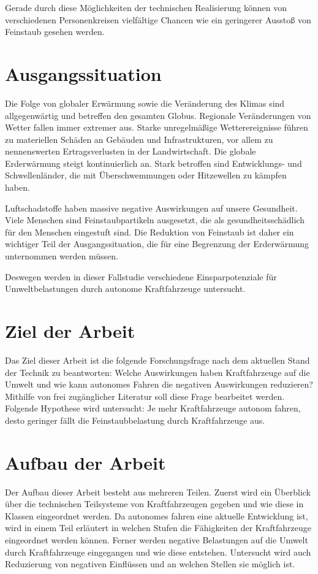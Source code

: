 Gerade durch diese Möglichkeiten der technischen Realisierung können von verschiedenen Personenkreisen
vielfältige Chancen wie ein geringerer Ausstoß von Feinstaub gesehen werden.

\section{Ausgangssituation}
Die Folge von globaler Erwärmung sowie die Veränderung des Klimas sind allgegenwärtig und betreffen den gesamten Globus.
Regionale Veränderungen von Wetter fallen immer extremer aus.
Starke unregelmäßige Wetterereignisse führen zu materiellen Schäden an Gebäuden und Infrastrukturen, vor allem zu nennenswerten Ertragsverlusten in der Landwirtschaft.
Die globale Erderwärmung steigt kontinuierlich an.
Stark betroffen sind Entwicklungs- und Schwellenländer, die mit Überschwemmungen oder Hitzewellen zu kämpfen haben.


Luftschadstoffe haben massive negative Auswirkungen auf unsere Gesundheit.
Viele Menschen sind Feinstaubpartikeln ausgesetzt, die als gesundheitsschädlich für den Menschen eingestuft sind.
Die Reduktion von Feinstaub ist daher ein wichtiger Teil der Ausgangssituation, die für eine Begrenzung der Erderwärmung unternommen werden müssen.

Deswegen werden in dieser Fallstudie verschiedene Einsparpotenziale für Umweltbelastungen durch autonome Kraftfahrzeuge untersucht.


\section{Ziel der Arbeit}
Das Ziel dieser Arbeit ist die folgende Forschungsfrage nach dem aktuellen Stand der Technik zu beantworten:
Welche Auswirkungen haben Kraftfahrzeuge auf die Umwelt und wie kann autonomes Fahren die negativen Auswirkungen reduzieren?
Mithilfe von frei zugänglicher Literatur soll diese Frage bearbeitet werden.
Folgende Hypothese wird untersucht:
Je mehr Kraftfahrzeuge autonom fahren, desto geringer fällt die Feinstaubbelastung durch Kraftfahrzeuge aus.

\newpage

\section{Aufbau der Arbeit}
Der Aufbau dieser Arbeit besteht aus mehreren Teilen.
Zuerst wird ein Überblick über die technischen Teilsysteme von Kraftfahrzeugen gegeben und wie diese
in Klassen eingeordnet werden.
Da autonomes fahren eine aktuelle Entwicklung ist, wird in einem Teil erläutert in welchen Stufen die Fähigkeiten der Kraftfahrzeuge eingeordnet werden können.
Ferner werden negative Belastungen auf die Umwelt durch Kraftfahrzeuge eingegangen und wie diese entstehen.
Untersucht wird auch Reduzierung von negativen Einflüssen und an welchen Stellen sie möglich ist.

\newpage